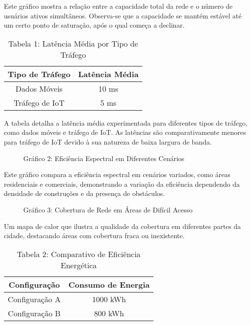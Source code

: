 \documentclass[journal]{IEEEtran}
\begin{document}
Este gráfico mostra a relação entre a capacidade total da rede e o número de usuários ativos simultâneos. Observa-se que a capacidade se mantém estável até um certo ponto de saturação, após o qual começa a declinar.

\begin{table}[htbp]
  \centering
  \caption{Tabela 1: Latência Média por Tipo de Tráfego}
  \begin{tabular}{|c|c|}
    \hline
    Tipo de Tráfego & Latência Média \\
    \hline
    Dados Móveis & 10 ms \\
    Tráfego de IoT & 5 ms \\
    \hline
  \end{tabular}
\end{table}

A tabela detalha a latência média experimentada para diferentes tipos de tráfego, como dados móveis e tráfego de IoT. As latências são comparativamente menores para tráfego de IoT devido à sua natureza de baixa largura de banda.

\begin{figure}[htbp]
  \centering
  \caption{Gráfico 2: Eficiência Espectral em Diferentes Cenários}
\end{figure}

Este gráfico compara a eficiência espectral em cenários variados, como áreas residenciais e comerciais, demonstrando a variação da eficiência dependendo da densidade de construções e da presença de obstáculos.

\begin{figure}[htbp]
  \centering
  \caption{Gráfico 3: Cobertura de Rede em Áreas de Difícil Acesso}
\end{figure}

Um mapa de calor que ilustra a qualidade da cobertura em diferentes partes da cidade, destacando áreas com cobertura fraca ou inexistente.

\begin{table}[htbp]
  \centering
  \caption{Tabela 2: Comparativo de Eficiência Energética}
  \begin{tabular}{|c|c|}
    \hline
    Configuração & Consumo de Energia \\
    \hline
    Configuração A & 1000 kWh \\
    Configuração B & 800 kWh \\
    \hline
  \end{tabular}
\end{table}
\end{document}

